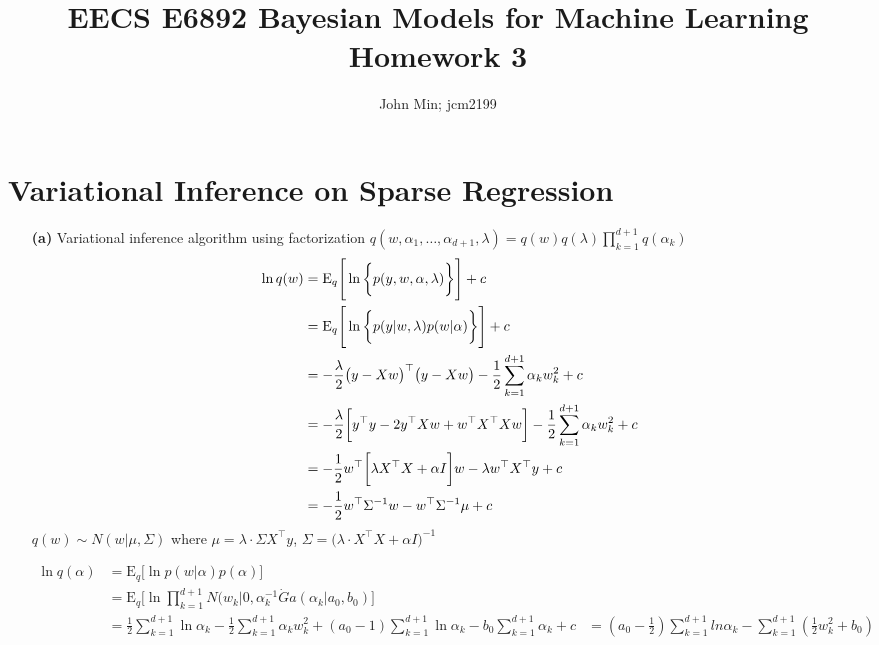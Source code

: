 \documentclass[10pt]{article} %
\title{EECS E6892 Bayesian Models for Machine Learning\\ Homework 3}
\author{John Min; jcm2199}
\begin{document}
\maketitle

\newcommand{\E}{\mathrm{E}}
\newcommand{\Var}{\mathrm{Var}}
\newcommand{\Cov}{\mathrm{Cov}}



\section{Variational Inference on Sparse Regression}

\begin{enumerate}
\item[\textbf{(a)}] Variational inference algorithm using factorization $q(w, \alpha_1, \ldots, \alpha_{d+1}, \lambda) = q(w)q(\lambda) \prod_{k=1}^{d+1} q(\alpha_k)$\\

\noindent
\begin{align*}
\ln q(w) &= \E_q \Bigg[ \ln \bigg\{ p(y, w, \alpha, \lambda) \bigg\} \Bigg] + c \\
	       &= \E_q \Bigg[\ln \bigg\{ p(y | w, \lambda) p (w | \alpha) \bigg\} \Bigg] + c \\
	\displaystyle & = - \frac{\lambda}{2} \big(y - Xw \big)^\top \big(y - Xw \big) - \frac{1}{2} \sum_{k=1}^{d+1} \alpha_k w_k^2 + c \\
		& = -\frac{\lambda}{2} \bigg[y^\top y - 2y^\top Xw + w^\top X^\top X w \bigg] - \frac{1}{2} \sum_{k=1}^{d+1} \alpha_k w_k^2 + c\\
		& = -\frac{1}{2} w^\top \bigg[\lambda X^\top X + \alpha I \bigg] w - \lambda w^\top X^\top y + c \\
		& = -\frac{1}{2} w^\top \Sigma^{-1} w - w^\top \Sigma^{-1} \mu + c 
\end{align*}
$q(w) \sim N(w|\mu, \Sigma)$
where $ \displaystyle \mu = \lambda \cdot \Sigma X^\top y$, $\Sigma = \bigg(\lambda \cdot X^\top X + \alpha I \bigg)^{-1}$

\begin{align*}
\ln q(\alpha) &= \E_q \Bigg[ \ln p(w|\alpha) p(\alpha) \Bigg] \\
		   &= \E_q \Bigg[ \ln \prod_{k=1}^{d+1} N(w_k| 0, \alpha_k^{-1} \dot Ga(\alpha_k | a_0, b_0) \Bigg]\\
		   &= \frac{1}{2} \sum_{k=1}^{d+1} \ln \alpha_k - \frac{1}{2}  \sum_{k=1}^{d+1} \alpha_k w_k^2 + (a_0-1)  \sum_{k=1}^{d+1} \ln \alpha_k - b_0  \sum_{k=1}^{d+1} \alpha_k + c
		   &= (a_0 - \frac{1}{2})  \sum_{k=1}^{d+1} ln \alpha_k -  \sum_{k=1}^{d+1} (\frac{1}{2} w_k^2 + b_0)
\end{align*}


\end{enumerate}
\end{document}
